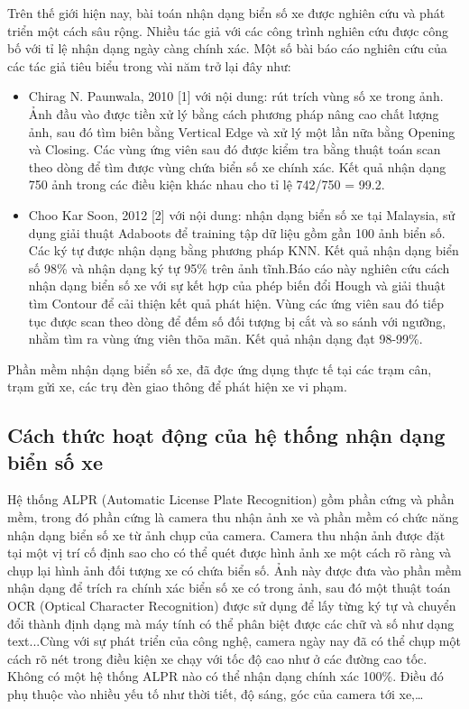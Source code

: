 	    Trên thế giới hiện nay, bài toán nhận dạng biển số xe được nghiên cứu và phát triển một cách sâu rộng. Nhiều tác giả với các công trình nghiên cứu được công bố với tỉ lệ nhận dạng ngày càng chính xác. Một số bài báo cáo nghiên cứu của các tác giả tiêu biểu trong vài năm trở lại đây như:
	    \begin{itemize}
	        \item Chirag N. Paunwala, 2010 [1] với nội dung: rút trích vùng số xe trong ảnh. Ảnh đầu vào được tiền xử lý bằng cách phương pháp nâng cao chất lượng ảnh, sau đó tìm biên bằng Vertical Edge và xử lý một lần nữa bằng Opening và Closing. Các vùng ứng viên sau đó được kiểm tra bằng thuật toán scan theo dòng để tìm được vùng chứa biển số xe chính xác. Kết quả nhận dạng 750 ảnh trong các điều kiện khác nhau cho tỉ lệ 742/750 = 99.2.
	        \item Choo Kar Soon, 2012 [2] với nội dung: nhận dạng biển số xe tại Malaysia, sử dụng giải thuật Adaboots để training tập dữ liệu gồm gần 100 ảnh biển số. Các ký tự được nhận dạng bằng phương pháp KNN. Kết quả nhận dạng biển số 98\% và nhận dạng ký tự 95\% trên ảnh tĩnh.Báo cáo này nghiên cứu cách nhận dạng biển số xe với sự kết hợp của phép biến đổi Hough và giải thuật tìm Contour để cải thiện kết quả phát hiện. Vùng các ứng viên sau đó tiếp tục được scan theo dòng để đếm số đối tượng bị cắt và so sánh với ngưỡng, nhằm tìm ra vùng ứng viên thõa mãn. Kết quả nhận dạng đạt 98-99\%.
	    \end{itemize}
    	Phần mềm nhận dạng biển số xe, đã đợc ứng dụng thực tế tại các trạm cân, trạm gửi xe, các trụ đèn giao thông để phát hiện xe vi phạm.
    	\subsection{Cách thức hoạt động của hệ thống nhận dạng biển số xe}
    	Hệ thống ALPR (Automatic License Plate Recognition) gồm phần cứng và phần mềm, trong đó phần cứng là camera thu nhận ảnh xe và phần mềm có chức năng nhận dạng biển số xe từ ảnh chụp của camera. Camera thu nhận ảnh được đặt tại một vị trí cố định sao cho có thể quét được hình ảnh xe một cách rõ ràng và chụp lại hình ảnh đối tượng xe có chứa biển số. Ảnh này được đưa  vào phần mềm nhận dạng để trích ra chính xác biển số xe có trong ảnh, sau đó một thuật toán OCR (Optical Character Recognition) được sử dụng để lấy từng ký tự và chuyển đổi thành định dạng mà máy tính có thể phân biệt được các chữ và số như dạng text...Cùng với sự phát triển của công nghệ, camera ngày nay đã có thể chụp một cách rõ nét trong điều kiện xe chạy với tốc độ cao như ở các đường cao tốc. Không có một hệ thống ALPR nào có thể nhận dạng chính xác 100\%. Điều đó phụ thuộc vào nhiều yếu tố như thời tiết, độ sáng, góc của camera tới xe,…
    	
